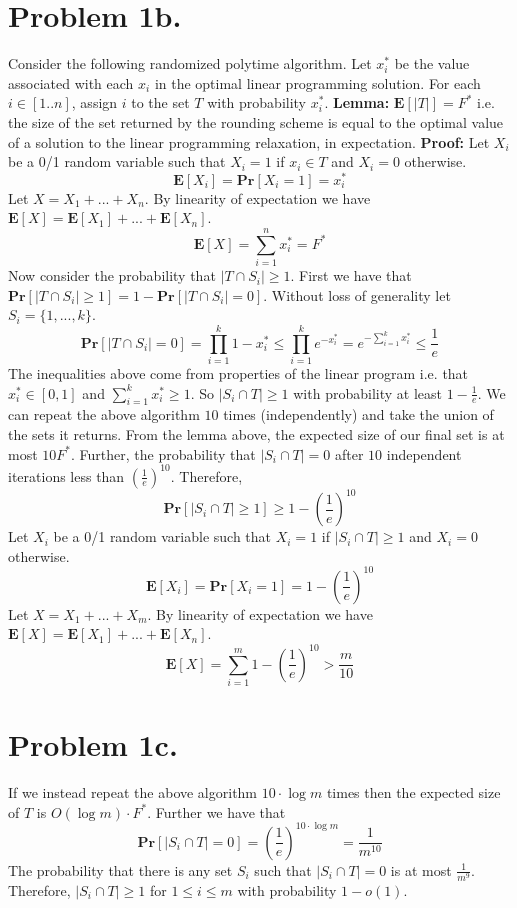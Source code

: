 \documentclass[12pt]{article}
\begin{document}
\section*{Problem 1b.}
Consider the following randomized polytime algorithm. Let $x^*_i$ be the value
associated with each $x_i$ in the optimal linear programming solution. For each
$i \in [1..n]$, assign $i$ to the set $T$ with probability $x^*_i$.
\vspace{2mm}
\newline
\textbf{Lemma:} $\textbf{E}[|T|] = F^*$ i.e. the size of the set returned
by the rounding scheme is equal to the optimal value of a solution to the linear
programming relaxation, in expectation.
\vspace{2mm}
\newline
\textbf{Proof:} Let $X_i$ be a 0/1 random variable such that
$X_i = 1$ if $x_i \in T$ and $X_i = 0$ otherwise.
$$\textbf{E}[X_i] = \textbf{Pr}[X_i = 1] = x^*_i$$
Let $X = X_1 + ... + X_n$. By linearity of expectation we have
$\textbf{E}[X] = \textbf{E}[X_1] + ... + \textbf{E}[X_n]$.
$$\textbf{E}[X] = \sum^n_{i=1} x^*_i = F^*$$
Now consider the probability that $|T\cap S_i|\ge 1$. First we have that
$\textbf{Pr}[|T\cap S_i| \ge 1] = 1 - \textbf{Pr}[|T\cap S_i| = 0]$.
Without loss of generality let $S_i = \{1,...,k\}$.
$$ \textbf{Pr}[|T\cap S_i| = 0] =
\prod_{i=1}^k 1-x^*_i \le \prod_{i=1}^k e^{-x^*_i}
= e^{-\sum^k_{i=1} x^*_i} \le \frac{1}{e}$$
The inequalities above come from properties of the linear program i.e. that
$x^*_i \in [0,1]$ and $\sum^k_{i=1} x^*_i \ge 1$. So $|S_i \cap T| \ge 1$ with
probability at least $1-\frac{1}{e}$.
\vspace{3mm}
\newline
We can repeat the above algorithm $10$ times (independently) and take the union
of the sets it returns. From the lemma above, the expected size of our final set
is at most $10F^*$. Further, the probability that $|S_i \cap T| = 0$ after
$10$ independent iterations less than $\left(\frac{1}{e}\right)^{10}$.
Therefore,
$$\textbf{Pr}[|S_i\cap T| \ge 1] \ge 1 - \left(\frac{1}{e}\right)^{10}$$
Let $X_i$ be a 0/1 random variable such that $X_i = 1$ if $|S_i \cap T| \ge 1$
and $X_i = 0$ otherwise.
$$\textbf{E}[X_i] = \textbf{Pr}[X_i = 1] = 1 - \left(\frac{1}{e}\right)^{10}$$
Let $X = X_1 + ... + X_m$. By linearity of expectation we have
$\textbf{E}[X] = \textbf{E}[X_1] + ... + \textbf{E}[X_n]$.
$$\textbf{E}[X] = \sum^m_{i=1} 1 - \left(\frac{1}{e}\right)^{10} > \frac{m}{10}$$

\section*{Problem 1c.}
If we instead repeat the above algorithm $10 \cdot \log m$ times then the
expected size of $T$ is $O(\log m)\cdot F^*$. Further we have that
$$\textbf{Pr}[|S_i\cap T| = 0]
= \left(\frac{1}{e}\right)^{10\cdot \log m} = \frac{1}{m^{10}}$$
The probability that there is any set $S_i$ such that $|S_i\cap T| = 0$ is at
most $\frac{1}{m^9}$. Therefore, $|S_i\cap T| \ge 1$ for $1 \le i \le m$ with
probability $1-o(1)$.
\end{document}
